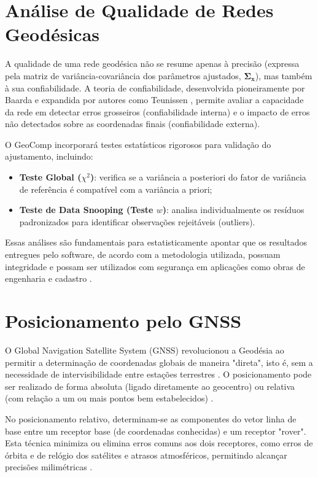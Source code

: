 \documentclass[
        12pt,                           %
        openright,                      %
        oneside,
        a4paper,                        %
        chapter=TITLE,         %
        section=TITLE,         %
        subsection=Title,      %
        english,                        %
        portugues,                      %
        ]{abntex2}
\begin{document}
\section{Análise de Qualidade de Redes Geodésicas}

A qualidade de uma rede geodésica não se resume apenas à precisão (expressa pela matriz de variância-covariância dos parâmetros ajustados, $\boldsymbol{\Sigma}_{\mathbf{x}}$), mas também à sua confiabilidade. A teoria de confiabilidade, desenvolvida pioneiramente por Baarda \cite{baarda_reliability} e expandida por autores como Teunissen \cite{teunissen_testing}, permite avaliar a capacidade da rede em detectar erros grosseiros (confiabilidade interna) e o impacto de erros não detectados sobre as coordenadas finais (confiabilidade externa).

O GeoComp incorporará testes estatísticos rigorosos para validação do ajustamento, incluindo:

\begin{itemize}
    \item \textbf{Teste Global ($\chi^2$)}: verifica se a variância a posteriori do fator de variância de referência é compatível com a variância a priori;
    \item \textbf{Teste de Data Snooping (Teste $w$)}: analisa individualmente os resíduos padronizados para identificar observações rejeitáveis (outliers).
\end{itemize}

Essas análises são fundamentais para estatisticamente apontar que os resultados entregues pelo software, de acordo com a metodologia utilizada, possuam integridade e possam ser utilizados com segurança em aplicações como obras de engenharia e cadastro \cite{torge_geodesy}.

\section{Posicionamento pelo GNSS}

O Global Navigation Satellite System (GNSS) revolucionou a Geodésia ao permitir a determinação de coordenadas globais de maneira "direta", isto é, sem a necessidade de intervisibilidade entre estações terrestres \cite{torge_geodesy}. O posicionamento pode ser realizado de forma absoluta (ligado diretamente ao geocentro) ou relativa (com relação a um ou mais pontos bem estabelecidos) \cite{monico_gnss}.

No posicionamento relativo, determinam-se as componentes do vetor linha de base entre um receptor base (de coordenadas conhecidas) e um receptor "rover". Esta técnica minimiza ou elimina erros comuns aos dois receptores, como erros de órbita e de relógio dos satélites e atrasos atmosféricos, permitindo alcançar precisões milimétricas \cite{leick_gps, hofmann_gnss}.
\end{document}
